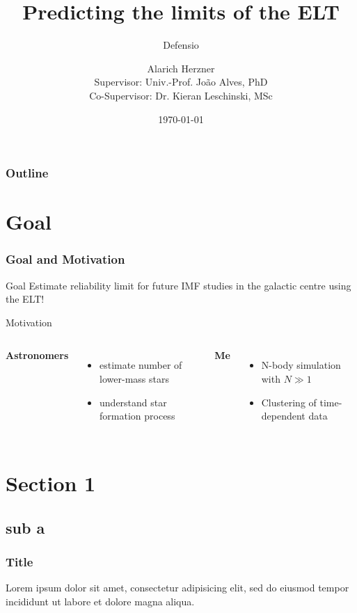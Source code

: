 \documentclass{beamer}
\title{Predicting the limits of the ELT}
\subtitle{Defensio}
\author[Alarich Herzner]{Alarich Herzner\\[1ex]  {\small Supervisor: Univ.-Prof. Jo\~ao Alves, PhD \\ Co-Supervisor: Dr. Kieran Leschinski, MSc}}
\institute{University of Vienna, Faculty of Physics}
\date{\today}
\begin{document}
\begin{frame}
\titlepage
\end{frame}

\begin{frame}
\frametitle{Outline}
\tableofcontents
\end{frame}

\section*{Goal}

\begin{frame}
\frametitle{Goal and Motivation}
\begin{block}{Goal}
Estimate reliability limit for future IMF studies in the galactic centre using the ELT!
\end{block}

\begin{block}{Motivation}
	\begin{columns}
	\textbf{Astronomers}\\
	\begin{itemize}
	\item estimate number of lower-mass stars
	\item understand star formation process
	\end{itemize}
	\textbf{Me}\\
	\begin{itemize}
	\item N-body simulation with \(N \gg 1\)
	\item Clustering of time-dependent data
	\end{itemize}
	\end{columns}
\end{block}


\end{frame}


\section{Section 1}
\subsection{sub a}

\begin{frame}
\frametitle{Title}
Lorem ipsum dolor sit amet, consectetur adipisicing elit, sed do eiusmod tempor incididunt ut labore et dolore magna aliqua.
\end{frame}
\end{document}
